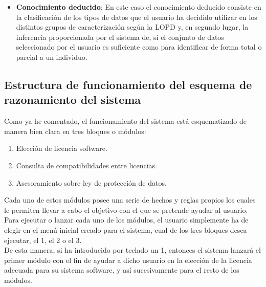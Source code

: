 \begin{itemize}
\begin{itemize}
			\item \textbf{Conocimiento deducido}: En este caso el conocimiento deducido consiste en la clasificación de los tipos de datos que el usuario ha decidido utilizar en los distintos grupos de caracterización según la LOPD y, en segundo lugar, la inferencia proporcionada por el sistema de, si el conjunto de datos seleccionado por el usuario es suficiente como para identificar de forma total o parcial a un individuo.
		\end{itemize}
\end{itemize}



\subsection{Estructura de funcionamiento del esquema de razonamiento del sistema}

Como ya he comentado, el funcionamiento del sistema está esquematizado de manera bien clara en tres bloques o módulos:
\begin{enumerate}
	\item Elección de licencia software.
	\item Consulta de compatibilidades entre licencias.
	\item Asesoramiento sobre ley de protección de datos.
\end{enumerate}

Cada uno de estos módulos posee una serie de hechos y reglas propios los cuales le permiten llevar a cabo el objetivo con el que se pretende ayudar al usuario.
Para ejecutar o lanzar cada uno de los módulos, el usuario simplemente ha de elegir en el menú inicial creado para el sistema, cual de los tres bloques desea ejecutar, el 1, el 2 o el 3.\\
De esta manera, si ha introducido por teclado un 1, entonces el sistema lanzará el primer módulo con el fin de ayudar a dicho usuario en la elección de la licencia adecuada para su sistema software, y así sucesivamente para el resto de los módulos.



